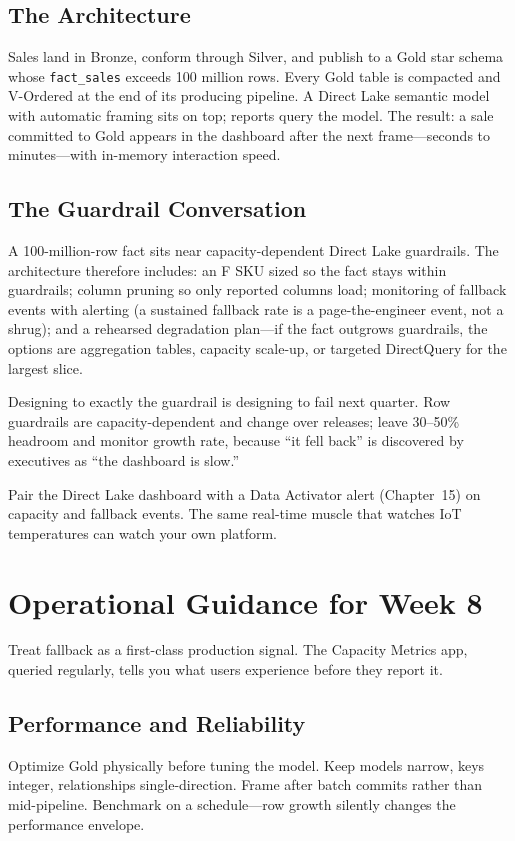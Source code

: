 \subsection{The Architecture}
Sales land in Bronze, conform through Silver, and publish to a Gold star schema whose \texttt{fact\_sales} exceeds 100 million rows. Every Gold table is compacted and V-Ordered at the end of its producing pipeline. A Direct Lake semantic model with automatic framing sits on top; reports query the model. The result: a sale committed to Gold appears in the dashboard after the next frame---seconds to minutes---with in-memory interaction speed.

\subsection{The Guardrail Conversation}
A 100-million-row fact sits near capacity-dependent Direct Lake guardrails. The architecture therefore includes: an F SKU sized so the fact stays within guardrails; column pruning so only reported columns load; monitoring of fallback events with alerting (a sustained fallback rate is a page-the-engineer event, not a shrug); and a rehearsed degradation plan---if the fact outgrows guardrails, the options are aggregation tables, capacity scale-up, or targeted DirectQuery for the largest slice.

\begin{pitfall}
Designing to exactly the guardrail is designing to fail next quarter. Row guardrails are capacity-dependent and change over releases; leave 30--50\% headroom and monitor growth rate, because ``it fell back'' is discovered by executives as ``the dashboard is slow.''
\end{pitfall}

\begin{tipbox}
Pair the Direct Lake dashboard with a Data Activator alert (Chapter~15) on capacity and fallback events. The same real-time muscle that watches IoT temperatures can watch your own platform.
\end{tipbox}

\section{Operational Guidance for Week 8}
Treat fallback as a first-class production signal. The Capacity Metrics app, queried regularly, tells you what users experience before they report it.

\subsection{Performance and Reliability}
Optimize Gold physically before tuning the model. Keep models narrow, keys integer, relationships single-direction. Frame after batch commits rather than mid-pipeline. Benchmark on a schedule---row growth silently changes the performance envelope.

